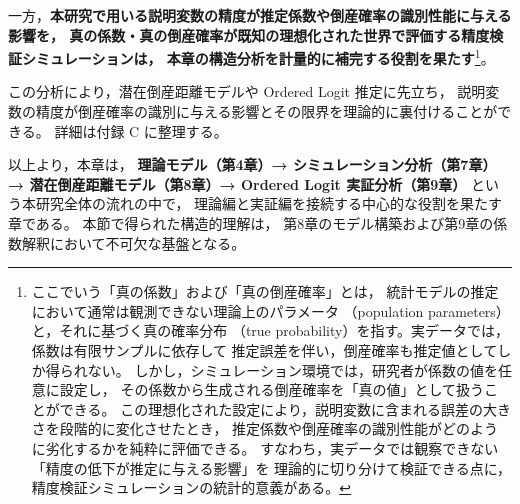 一方，\textbf{本研究で用いる説明変数の精度が推定係数や倒産確率の識別性能に与える影響を，
真の係数・真の倒産確率が既知の理想化された世界で評価する精度検証シミュレーションは，
本章の構造分析を計量的に補完する役割を果たす}\footnote{
ここでいう「真の係数」および「真の倒産確率」とは，
統計モデルの推定において通常は観測できない理論上のパラメータ
（population parameters）と，それに基づく真の確率分布
（true probability）を指す。実データでは，係数は有限サンプルに依存して
推定誤差を伴い，倒産確率も推定値としてしか得られない。
しかし，シミュレーション環境では，研究者が係数の値を任意に設定し，
その係数から生成される倒産確率を「真の値」として扱うことができる。
この理想化された設定により，説明変数に含まれる誤差の大きさを段階的に変化させたとき，
推定係数や倒産確率の識別性能がどのように劣化するかを純粋に評価できる。
すなわち，実データでは観察できない「精度の低下が推定に与える影響」を
理論的に切り分けて検証できる点に，精度検証シミュレーションの統計的意義がある。}。

この分析により，潜在倒産距離モデルや Ordered Logit 推定に先立ち，
説明変数の精度が倒産確率の識別に与える影響とその限界を理論的に裏付けることができる。
詳細は付録 C に整理する。


以上より，本章は，
\textbf{理論モデル（第4章）→ シミュレーション分析（第7章）→ 潜在倒産距離モデル（第8章）→ Ordered Logit 実証分析（第9章）}
という本研究全体の流れの中で，
理論編と実証編を接続する中心的な役割を果たす章である。
本節で得られた構造的理解は，
第8章のモデル構築および第9章の係数解釈において不可欠な基盤となる。


